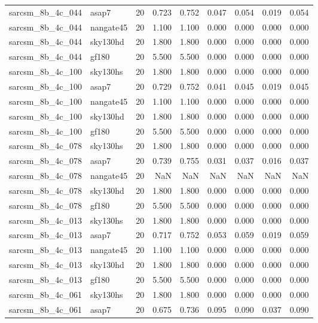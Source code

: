 \begin{tabular}{llrrrrrrr}
sarcsm\_8b\_4c\_044 & asap7 & 20 & 0.723 & 0.752 & 0.047 & 0.054 & 0.019 & 0.054 \\
sarcsm\_8b\_4c\_044 & nangate45 & 20 & 1.100 & 1.100 & 0.000 & 0.000 & 0.000 & 0.000 \\
sarcsm\_8b\_4c\_044 & sky130hd & 20 & 1.800 & 1.800 & 0.000 & 0.000 & 0.000 & 0.000 \\
sarcsm\_8b\_4c\_044 & gf180 & 20 & 5.500 & 5.500 & 0.000 & 0.000 & 0.000 & 0.000 \\
sarcsm\_8b\_4c\_100 & sky130hs & 20 & 1.800 & 1.800 & 0.000 & 0.000 & 0.000 & 0.000 \\
sarcsm\_8b\_4c\_100 & asap7 & 20 & 0.729 & 0.752 & 0.041 & 0.045 & 0.019 & 0.045 \\
sarcsm\_8b\_4c\_100 & nangate45 & 20 & 1.100 & 1.100 & 0.000 & 0.000 & 0.000 & 0.000 \\
sarcsm\_8b\_4c\_100 & sky130hd & 20 & 1.800 & 1.800 & 0.000 & 0.000 & 0.000 & 0.000 \\
sarcsm\_8b\_4c\_100 & gf180 & 20 & 5.500 & 5.500 & 0.000 & 0.000 & 0.000 & 0.000 \\
sarcsm\_8b\_4c\_078 & sky130hs & 20 & 1.800 & 1.800 & 0.000 & 0.000 & 0.000 & 0.000 \\
sarcsm\_8b\_4c\_078 & asap7 & 20 & 0.739 & 0.755 & 0.031 & 0.037 & 0.016 & 0.037 \\
sarcsm\_8b\_4c\_078 & nangate45 & 20 & NaN & NaN & NaN & NaN & NaN & NaN \\
sarcsm\_8b\_4c\_078 & sky130hd & 20 & 1.800 & 1.800 & 0.000 & 0.000 & 0.000 & 0.000 \\
sarcsm\_8b\_4c\_078 & gf180 & 20 & 5.500 & 5.500 & 0.000 & 0.000 & 0.000 & 0.000 \\
sarcsm\_8b\_4c\_013 & sky130hs & 20 & 1.800 & 1.800 & 0.000 & 0.000 & 0.000 & 0.000 \\
sarcsm\_8b\_4c\_013 & asap7 & 20 & 0.717 & 0.752 & 0.053 & 0.059 & 0.019 & 0.059 \\
sarcsm\_8b\_4c\_013 & nangate45 & 20 & 1.100 & 1.100 & 0.000 & 0.000 & 0.000 & 0.000 \\
sarcsm\_8b\_4c\_013 & sky130hd & 20 & 1.800 & 1.800 & 0.000 & 0.000 & 0.000 & 0.000 \\
sarcsm\_8b\_4c\_013 & gf180 & 20 & 5.500 & 5.500 & 0.000 & 0.000 & 0.000 & 0.000 \\
sarcsm\_8b\_4c\_061 & sky130hs & 20 & 1.800 & 1.800 & 0.000 & 0.000 & 0.000 & 0.000 \\
sarcsm\_8b\_4c\_061 & asap7 & 20 & 0.675 & 0.736 & 0.095 & 0.090 & 0.037 & 0.090 \\

\end{tabular}
